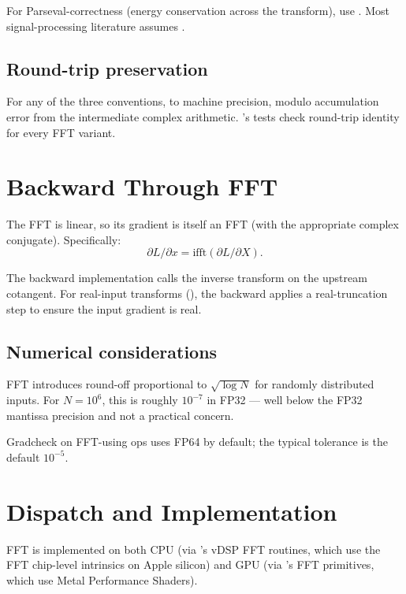 For Parseval-correctness (energy conservation across the
transform), use . Most signal-processing
literature assumes .

\subsection{Round-trip preservation}
\label{ssec:fft:round_trip}

For any of the three conventions,  to
machine precision, modulo accumulation error from the
intermediate complex arithmetic. \Lucid's tests check round-trip
identity for every FFT variant.

\section{Backward Through FFT}
\label{sec:fft:backward}

The FFT is linear, so its gradient is itself an FFT (with the
appropriate complex conjugate). Specifically:
\[
\partial L / \partial x = \text{ifft}(\partial L / \partial X).
\]

The backward implementation calls the inverse transform on the
upstream cotangent. For real-input transforms (), the
backward applies a real-truncation step to ensure the input
gradient is real.

\subsection{Numerical considerations}
\label{ssec:fft:numerical}

FFT introduces round-off proportional to $\sqrt{\log N}$ for
randomly distributed inputs. For $N = 10^6$, this is roughly
$10^{-7}$ in FP32 --- well below the FP32 mantissa precision and
not a practical concern.

Gradcheck on FFT-using ops uses FP64 by default; the typical
tolerance is the default $10^{-5}$.

\section{Dispatch and Implementation}
\label{sec:fft:dispatch}

FFT is implemented on both CPU (via \Accelerate's vDSP FFT
routines, which use the FFT chip-level intrinsics on Apple
silicon) and GPU (via \MLX's FFT primitives, which use Metal
Performance Shaders).


